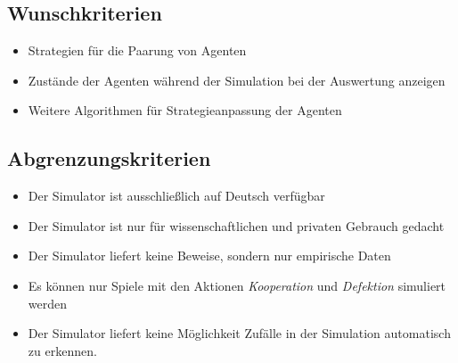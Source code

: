 \subsection{Wunschkriterien}
\begin{itemize}
\item Strategien für die Paarung von Agenten
\item Zustände der Agenten während der Simulation bei der Auswertung anzeigen
\item Weitere Algorithmen für Strategieanpassung der Agenten
\end{itemize}

\subsection{Abgrenzungskriterien}
\begin{itemize}
\item Der Simulator ist ausschließlich auf Deutsch verfügbar
\item Der Simulator ist nur für wissenschaftlichen und privaten Gebrauch gedacht
\item Der Simulator liefert keine Beweise, sondern nur empirische Daten
\item Es können nur Spiele mit den Aktionen \emph{Kooperation} und \emph{Defektion} simuliert werden
\item Der Simulator liefert keine Möglichkeit Zufälle in der Simulation automatisch zu erkennen.
\end{itemize}